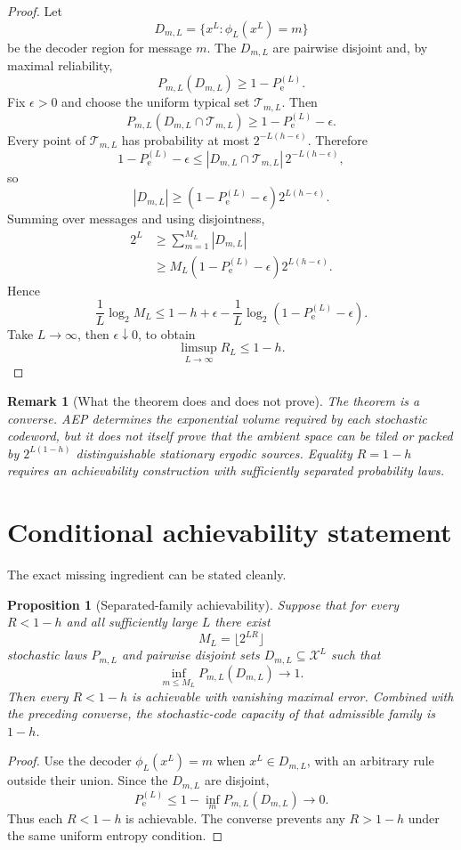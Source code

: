 \documentclass[11pt]{article}
\newtheorem{proposition}{Proposition}
\newtheorem{remark}{Remark}
\newcommand{\T}{\mathcal{T}}
\newcommand{\X}{\mathcal{X}}
\newcommand{\Pe}{P_{\mathrm e}}
\begin{document}
\begin{proof}
Let
\[
D_{m,L}=\{x^L:\phi_L(x^L)=m\}
\]
be the decoder region for message $m$.  The $D_{m,L}$ are pairwise disjoint and, by maximal reliability,
\[
P_{m,L}(D_{m,L})\ge1-\Pe^{(L)}.
\]
Fix $\epsilon>0$ and choose the uniform typical set $\T_{m,L}$.  Then
\[
P_{m,L}(D_{m,L}\cap\T_{m,L})
\ge 1-\Pe^{(L)}-\epsilon.
\]
Every point of $\T_{m,L}$ has probability at most $2^{-L(h-\epsilon)}$.  Therefore
\[
1-\Pe^{(L)}-\epsilon
\le |D_{m,L}\cap\T_{m,L}|\,2^{-L(h-\epsilon)},
\]
so
\[
|D_{m,L}|
\ge (1-\Pe^{(L)}-\epsilon)2^{L(h-\epsilon)}.
\]
Summing over messages and using disjointness,
\begin{align*}
2^L
&\ge \sum_{m=1}^{M_L}|D_{m,L}|\\
&\ge M_L(1-\Pe^{(L)}-\epsilon)2^{L(h-\epsilon)}.
\end{align*}
Hence
\[
\frac1L\log_2M_L
\le 1-h+\epsilon
-\frac1L\log_2(1-\Pe^{(L)}-\epsilon).
\]
Take $L\to\infty$, then $\epsilon\downarrow0$, to obtain
\[
\limsup_{L\to\infty}R_L\le1-h.
\]
\end{proof}

\begin{remark}[What the theorem does and does not prove]
The theorem is a converse.  AEP determines the exponential volume required by each stochastic codeword, but it does not itself prove that the ambient space can be tiled or packed by $2^{L(1-h)}$ distinguishable stationary ergodic sources.  Equality $R=1-h$ requires an achievability construction with sufficiently separated probability laws.
\end{remark}

\section{Conditional achievability statement}
The exact missing ingredient can be stated cleanly.

\begin{proposition}[Separated-family achievability]
Suppose that for every $R<1-h$ and all sufficiently large $L$ there exist
\[
M_L=\lfloor2^{LR}\rfloor
\]
stochastic laws $P_{m,L}$ and pairwise disjoint sets $D_{m,L}\subseteq\X^L$ such that
\[
\inf_{m\le M_L}P_{m,L}(D_{m,L})\longrightarrow1.
\]
Then every $R<1-h$ is achievable with vanishing maximal error.  Combined with the preceding converse, the stochastic-code capacity of that admissible family is $1-h$.
\end{proposition}

\begin{proof}
Use the decoder $\phi_L(x^L)=m$ when $x^L\in D_{m,L}$, with an arbitrary rule outside their union.  Since the $D_{m,L}$ are disjoint,
\[
\Pe^{(L)}\le 1-\inf_mP_{m,L}(D_{m,L})\to0.
\]
Thus each $R<1-h$ is achievable.  The converse prevents any $R>1-h$ under the same uniform entropy condition.
\end{proof}
\end{document}
